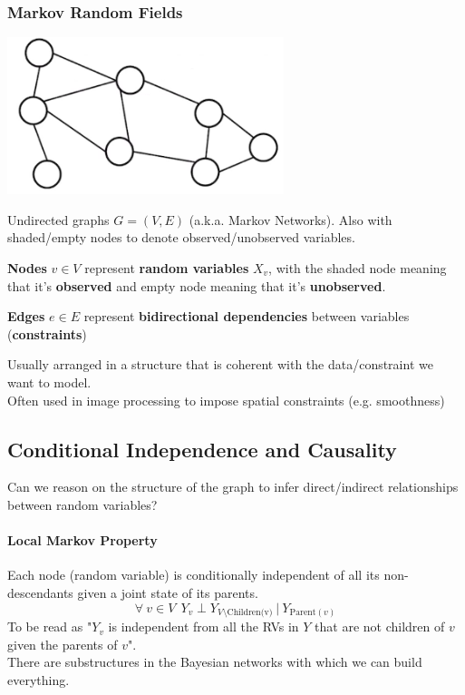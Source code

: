 \documentclass[10pt]{report}
\begin{document}
\subsubsection{Markov Random Fields}
\begin{center}
	\includegraphics[scale=0.5]{18.png}
\end{center}
Undirected graphs $G = (V,E)$ (a.k.a. Markov Networks). Also with shaded/empty nodes to denote observed/unobserved variables.
\begin{list}{}{}
	\item \textbf{Nodes} $v\in V$ represent \textbf{random variables} $X_v$, with the shaded node meaning that it's \textbf{observed} and empty node meaning that it's \textbf{unobserved}.
	\item \textbf{Edges} $e\in E$ represent \textbf{bidirectional dependencies} between variables (\textbf{constraints})
\end{list}
Usually arranged in a structure that is coherent with the data/constraint we want to model.\\
Often used in image processing to impose spatial constraints (e.g. smoothness)
\subsection{Conditional Independence and Causality}
Can we reason on the structure of the graph to infer direct/indirect relationships between random variables?
\paragraph{Local Markov Property} Each node (random variable) is conditionally independent of all its non-descendants given a joint state of its parents. $$\forall\:v\in V\:\:Y_v\perp Y_{V\setminus \text{Children(v)}}\:|\:Y_{\text{Parent}(v)}$$
To be read as "$Y_v$ is independent from all the RVs in $Y$ that are not children of $v$ given the parents of $v$".\\
There are substructures in the Bayesian networks with which we can build everything.
\end{document}
